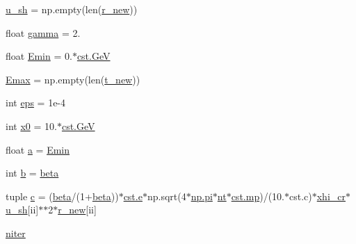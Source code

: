 \begin{DoxyCompactItemize}
\hyperlink{namespaceEscapeModel__protons_abf6e90959e3d1660385fdde463f9803e}{u\+\_\+sh} = np.\+empty(len(\hyperlink{namespaceEscapeModel__protons_a7c31400eb18c12fd0b7a7acafda225d0}{r\+\_\+new}))
\item 
float \hyperlink{namespaceEscapeModel__protons_a50bf6cc7f84c177e92583b046422296e}{gamma} = 2.
\item 
float \hyperlink{namespaceEscapeModel__protons_a7107c24679a9b21c930d08b32743b5cf}{Emin} = 0.$\ast$\hyperlink{constants_8h_aec0e126d9991db8ad0b26139f5860568}{cst.\+GeV}
\item 
\hyperlink{namespaceEscapeModel__protons_a827f9bf6da45815e7ea3e8b32871669a}{Emax} = np.\+empty(len(\hyperlink{namespaceEscapeModel__protons_a24ee5cc295e7b028a62d238479dfaec3}{t\+\_\+new}))
\item 
int \hyperlink{namespaceEscapeModel__protons_adbda0aec90568e3239247375d7efdb35}{eps} = 1e-\/4
\item 
int \hyperlink{namespaceEscapeModel__protons_ab902f80b6faa4b93d87cf4b45a390ddb}{x0} = 10.$\ast$\hyperlink{constants_8h_aec0e126d9991db8ad0b26139f5860568}{cst.\+GeV}
\item 
float \hyperlink{namespaceEscapeModel__protons_a063a612578b9139368e99d707ade70fe}{a} = \hyperlink{namespaceEscapeModel__protons_a7107c24679a9b21c930d08b32743b5cf}{Emin}
\item 
int \hyperlink{namespaceEscapeModel__protons_aba05547d0061c1800fcc308533f20660}{b} = \hyperlink{namespaceEscapeModel__protons_aed6ba9747962e8235f612edf7305ae9f}{beta}
\item 
tuple \hyperlink{namespaceEscapeModel__protons_a85e73fe6c388df6b0cd0dd3f971ddbb4}{c} = (\hyperlink{namespaceEscapeModel__protons_aed6ba9747962e8235f612edf7305ae9f}{beta}/(1+\hyperlink{namespaceEscapeModel__protons_aed6ba9747962e8235f612edf7305ae9f}{beta}))$\ast$\hyperlink{constants_8h_a2b076531cd50c7b55702a53221f2ac72}{cst.\+e}$\ast$np.\+sqrt(4$\ast$\hyperlink{constants_8h_a43016d873124d39034edb8cd164794db}{np.\+pi}$\ast$\hyperlink{namespaceEscapeModel__protons_aea8f96db5e10e84cf033c2f0000e9642}{nt}$\ast$\hyperlink{constants_8h_a6b331c08a80ed71d31c55a3341776483}{cst.\+mp})/(10.$\ast$cst.\+c)$\ast$\hyperlink{namespaceEscapeModel__protons_a0448c3c4f8095c021886f1311a7dd513}{xhi\+\_\+cr}$\ast$\hyperlink{namespaceEscapeModel__protons_abf6e90959e3d1660385fdde463f9803e}{u\+\_\+sh}\mbox{[}ii\mbox{]}$\ast$$\ast$2$\ast$\hyperlink{namespaceEscapeModel__protons_a7c31400eb18c12fd0b7a7acafda225d0}{r\+\_\+new}\mbox{[}ii\mbox{]}
\item 
\hyperlink{namespaceEscapeModel__protons_ac1fb6618d1d26a01e05eb54e0750fcca}{niter}
$$
\end{DoxyCompactItemize}
